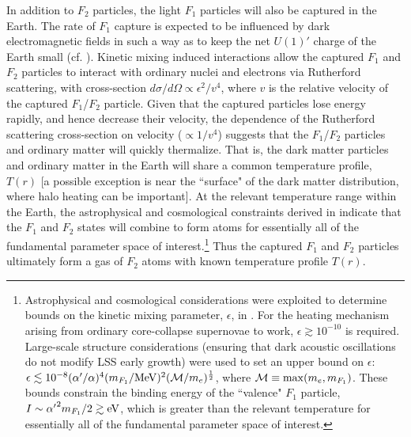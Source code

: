 \documentclass[12pt]{article}
\begin{document}
In addition to $F_2$ particles, the light $F_1$ particles will also be captured in the Earth. The rate of $F_1$ capture is expected to be influenced by dark electromagnetic fields in
such a way as to keep the net $U(1)'$ charge of the Earth small (cf. \cite{electron}). Kinetic mixing induced interactions allow the captured $F_1$ and $F_2$ particles to interact with ordinary nuclei and electrons via Rutherford scattering, with cross-section $d\sigma/d\Omega \propto \epsilon ^2/v ^4$, where $v$ is the relative velocity of the captured $F_1$/$F_2$ particle. Given that the captured particles lose energy rapidly, and hence decrease their velocity, the dependence of the Rutherford scattering cross-section on velocity ($\propto 1/v ^4$) suggests that the $F_1$/$F_2$ particles and ordinary matter will quickly thermalize. That is, the dark matter particles and ordinary matter in the Earth will share a common temperature profile, $T(r)$ [a possible exception is near the ``surface" of the dark matter distribution, where halo heating can be important]. At the relevant temperature range within the Earth, the astrophysical and cosmological constraints derived in \cite{dhsdm} indicate that the $F_1$ and $F_2$ states will combine to form atoms for essentially all of the fundamental parameter space of interest.\footnote{Astrophysical and cosmological considerations were exploited to determine bounds on the kinetic mixing parameter, $\epsilon$, in \cite{dhsdm}. For the heating mechanism arising from ordinary core-collapse supernovae to work, $\epsilon \gtrsim 10 ^{-10}$ is required. Large-scale structure considerations (ensuring that dark acoustic oscillations do not modify LSS early growth) were used to set an upper bound on $\epsilon$: $\epsilon \lesssim 10 ^{-8}(\alpha '/\alpha) ^4(m _{F_1}/{\rm MeV}) ^2({\cal M}/m _e) ^{\frac{1}{2}}$, where ${\cal M} \equiv \max(m _e,m _{F_1})$. These bounds constrain the binding energy of the ``valence" $F_1$ particle, $I \sim {\alpha '} ^2m _{F_1}/2 \gtrsim {\rm eV}$, which is greater than the relevant temperature for essentially all of the fundamental parameter space of interest.} Thus the captured $F_1$ and $F_2$ particles ultimately form a gas of $F_2$ atoms with known temperature profile $T(r)$.
\end{document}

